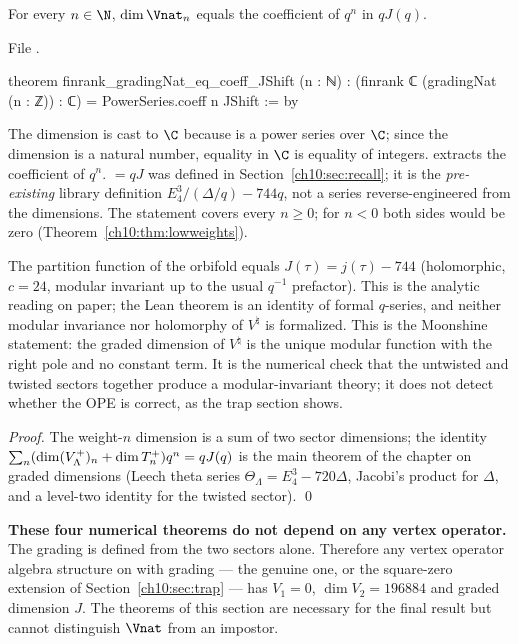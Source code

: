 \begin{theorem}[Graded dimension $=J$]\label{ch10:thm:J}
For every $n\in\N$, $\dim\Vnat_n$ equals the coefficient of $q^n$ in $qJ(q)$.
\end{theorem}
\noindent File .
\begin{leancode}
theorem finrank_gradingNat_eq_coeff_JShift (n : ℕ) :
    (finrank ℂ (gradingNat (n : ℤ)) : ℂ) = PowerSeries.coeff n JShift := by
\end{leancode}
\begin{dictionary}
The dimension is cast to $\C$ because  is a power series over $\C$; since the
dimension is a natural number, equality in $\C$ is equality of integers.  
extracts the coefficient of $q^n$.   $=qJ$ was defined in
Section~\ref{ch10:sec:recall}; it is the \emph{pre-existing} library definition
$E_4^3/(\Delta/q)-744q$, not a series reverse-engineered from the dimensions.  The statement
covers every $n\ge0$; for $n<0$ both sides would be zero (Theorem~\ref{ch10:thm:lowweights}).
\end{dictionary}

\begin{physics}
The partition function of the orbifold equals $J(\tau)=j(\tau)-744$ (holomorphic, $c=24$, modular invariant up to the usual $q^{-1}$ prefactor). This is the analytic reading on paper; the Lean theorem is an identity of formal $q$-series, and neither modular invariance nor holomorphy of $V^\natural$ is formalized. This is the Moonshine statement: the graded dimension of $V^\natural$ is the unique modular function with the right pole and no constant term. It is the numerical check that the untwisted and twisted sectors together produce a modular-invariant theory; it does not detect whether the OPE is correct, as the trap section shows.
\end{physics}

\emph{Proof.} The weight-$n$ dimension is a sum of two sector dimensions; the identity
$\sum_n(\dim(V_{\Lambda}^{+})_n+\dim T^{+}_n)q^n=qJ(q)$ is the main theorem of the chapter on graded
dimensions (Leech theta series $\Theta_\Lambda=E_4^3-720\Delta$, Jacobi's product for $\Delta$, and a
level-two identity for the twisted sector). \qed

\begin{warning}
\textbf{These four numerical theorems do not depend on any vertex operator.}  The grading
 is defined from the two sectors alone.  Therefore any vertex operator algebra
structure on  with grading  --- the genuine one, or the square-zero
extension of Section~\ref{ch10:sec:trap} --- has $V_1=0$, $\dim V_2=196884$ and graded dimension
$J$.  The theorems of this section are necessary for the final result but cannot distinguish
$\Vnat$ from an impostor.
\end{warning}

